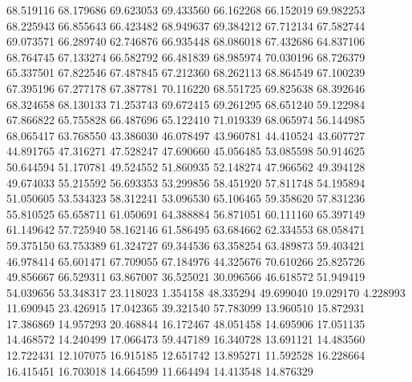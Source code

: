 68.519116
68.179686
69.623053
69.433560
66.162268
66.152019
69.982253
68.225943
66.855643
66.423482
68.949637
69.384212
67.712134
67.582744
69.073571
66.289740
62.746876
66.935448
68.086018
67.432686
64.837106
68.764745
67.133274
66.582792
66.481839
68.985974
70.030196
68.726379
65.337501
67.822546
67.487845
67.212360
68.262113
68.864549
67.100239
67.395196
67.277178
67.387781
70.116220
68.551725
69.825638
68.392646
68.324658
68.130133
71.253743
69.672415
69.261295
68.651240
59.122984
67.866822
65.755828
66.487696
65.122410
71.019339
68.065974
56.144985
68.065417
63.768550
43.386030
46.078497
43.960781
44.410524
43.607727
44.891765
47.316271
47.528247
47.690660
45.056485
53.085598
50.914625
50.644594
51.170781
49.524552
51.860935
52.148274
47.966562
49.394128
49.674033
55.215592
56.693353
53.299856
58.451920
57.811748
54.195894
51.050605
53.534323
58.312241
53.096530
65.106465
59.358620
57.831236
55.810525
65.658711
61.050691
64.388884
56.871051
60.111160
65.397149
61.149642
57.725940
58.162146
61.586495
63.684662
62.334553
68.058471
59.375150
63.753389
61.324727
69.344536
63.358254
63.489873
59.403421
46.978414
65.601471
67.709055
67.184976
44.325676
70.610266
25.825726
49.856667
66.529311
63.867007
36.525021
30.096566
46.618572
51.949419
54.039656
53.348317
23.118023
1.354158
48.335294
49.699040
19.029170
4.228993
11.690945
23.426915
17.042365
39.321540
57.783099
13.960510
15.872931
17.386869
14.957293
20.468844
16.172467
48.051458
14.695906
17.051135
14.468572
14.240499
17.066473
59.447189
16.340728
13.691121
14.483560
12.722431
12.107075
16.915185
12.651742
13.895271
11.592528
16.228664
16.415451
16.703018
14.664599
11.664494
14.413548
14.876329
